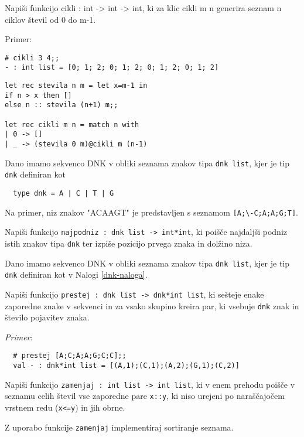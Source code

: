 \begin{ex}
  Napi\v si funkcijo cikli : int -> int -> int, ki za klic cikli m n
  generira seznam n ciklov \v stevil od 0 do m-1.

\noindent\/Primer:
\begin{lstlisting}
# cikli 3 4;; 
- : int list = [0; 1; 2; 0; 1; 2; 0; 1; 2; 0; 1; 2]
\end{lstlisting}

\begin{sol}
\begin{lstlisting}
let rec stevila n m = let x=m-1 in
if n > x then []
else n :: stevila (n+1) m;;

let rec cikli m n = match n with
| 0 -> []
| _ -> (stevila 0 m)@cikli m (n-1)
\end{lstlisting}
\end{sol}

\end{ex} 
\begin{ex}
  \label{dnk-naloga}
  Dano imamo sekvenco DNK v obliki seznama znakov tipa \lstinline{dnk list},
  kjer je tip \lstinline{dnk} definiran kot

\begin{lstlisting}
  type dnk = A | C | T | G
\end{lstlisting}
  Na primer, niz znakov "ACAAGT"  je predstavljen s seznamom 
  \lstinline{[A;\-C;A;A;G;T]}. 

  Napi\v si funkcijo \lstinline{najpodniz : dnk list -> int*int}, ki
  poi\v s\v ce najdalj\v si podniz istih znakov tipa \lstinline{dnk} ter
  izpi\v se pozicijo prvega znaka in dol\v zino niza.


\end{ex} 
\begin{ex}
  Dano imamo sekvenco DNK v obliki seznama znakov tipa \lstinline{dnk list},
  kjer je tip \lstinline{dnk} definiran kot v Nalogi \ref{dnk-naloga}.

  Napi\v si funkcijo \lstinline{prestej : dnk list -> dnk*int list}, ki
  se\v steje enake zaporedne znake v sekvenci in za vsako skupino
  kreira par, ki vsebuje \lstinline{dnk} znak in \v stevilo pojavitev
  znaka.

  \emph{Primer}: 
\begin{lstlisting}
  # prestej [A;C;A;A;G;C;C];;
  val - : dnk*int list = [(A,1);(C,1);(A,2);(G,1);(C,2)]
\end{lstlisting}


\end{ex} 
\begin{ex}
  Napi\v si funkcijo \lstinline{zamenjaj : int list -> int list}, ki v
  enem prehodu poi\v s\v ce v seznamu celih \v stevil vse zaporedne
  pare \lstinline{x::y}, ki niso urejeni po nara\v s\v cajo\v cem vrstnem
  redu (\lstinline{x<=y}) in jih obrne.

  Z uporabo funkcije \lstinline{zamenjaj} implementiraj sortiranje seznama.


\end{ex} 

